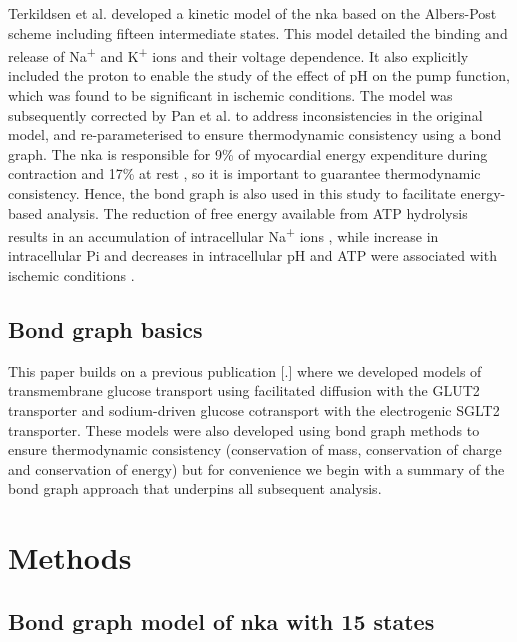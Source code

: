 \documentclass{biophys-new}
\begin{document}
Terkildsen et al. \cite{terkildsen_balance_2007} developed a kinetic model of the \Gls{nka} based on the Albers-Post scheme including fifteen intermediate states.
This model detailed the binding and release of Na\textsuperscript{+} and K\textsuperscript{+} ions and their voltage dependence.
It also explicitly included the proton to enable the study of the effect of pH on the pump function,
which was found to be significant in ischemic conditions.
The model was subsequently corrected by Pan et al. \cite{pan_cardiac_2020} to address inconsistencies in the original model,
and re-parameterised to ensure thermodynamic consistency using a bond graph.
The \Gls{nka} is responsible for 9\% of myocardial energy expenditure during contraction and 17\% at rest \cite{schramm1994energy},
so it is important to guarantee thermodynamic consistency.
Hence, the bond graph is also used in this study to facilitate energy-based analysis.
The reduction of free energy available from ATP hydrolysis results in an accumulation of intracellular Na\textsuperscript{+} ions \cite{jansen2003energy},
while increase in intracellular Pi and decreases in intracellular pH and ATP were associated with ischemic conditions \cite{huang1984regulation}.

\subsection*{Bond graph basics}

This paper builds on a previous publication {[}.{]} where we developed
models of transmembrane glucose transport using facilitated diffusion
with the GLUT2 transporter and sodium-driven glucose cotransport with
the electrogenic SGLT2 transporter. These models were also developed
using bond graph methods to ensure thermodynamic consistency
(conservation of mass, conservation of charge and conservation of
energy) but for convenience we begin with a summary of the bond graph
approach that underpins all subsequent analysis.


\section*{Methods}


\subsection*{Bond graph model of \Gls{nka} with 15 states}


\cite{pan_cardiac_2020}
\end{document}
